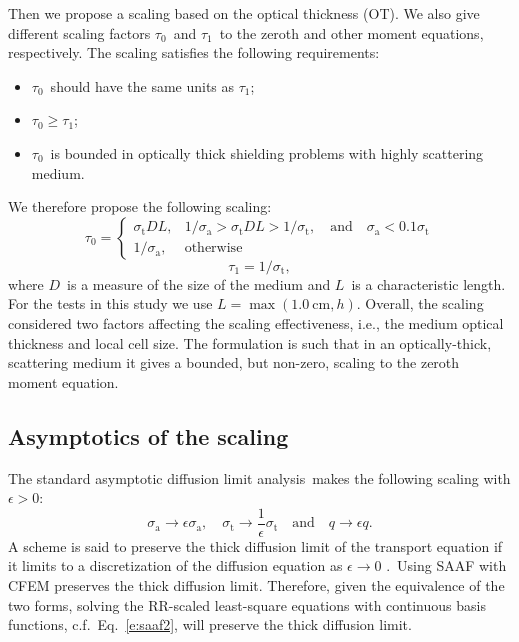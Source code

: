 \documentclass[review]{elsarticle}
\newcommand{\st}{\sigma_\mathrm{t}}
\newcommand{\siga}{\sigma_\mathrm{a}}
\newcommand{\quand}{\quad\mathrm{and}\quad}
\begin{document}
Then we propose a scaling based on the optical thickness (OT). We also give different scaling factors $\tau_0$\ and $\tau_1$\ to the zeroth and other moment equations, respectively. The scaling satisfies the following requirements:
\begin{itemize}
	\item $\tau_0$\ should have the same units as $\tau_1$;
	\item $\tau_0\geq\tau_1$;
	\item $\tau_0$\ is bounded in optically thick shielding problems with highly scattering medium.
\end{itemize}
We therefore propose the following scaling:
\begin{equation}\label{e:tau}
\tau_0=\begin{cases}
\st DL,&1/\siga>\st DL>1/\st, \quad \text{and} \quad \siga<0.1\st\\
1/\siga,&\mathrm{otherwise}
\end{cases}
\end{equation}
\begin{equation}
\tau_1=1/\st,
\end{equation}
where $D$\ is a measure of the size of the medium and $L$\ is a characteristic length. For the tests in this study we use  $L=\max(1.0\ \mathrm{cm}, h)$. Overall, the scaling considered two factors affecting the scaling effectiveness, i.e., the medium optical thickness and local cell size. %
The formulation is such that in an optically-thick, scattering medium it gives a bounded, but non-zero, scaling to the zeroth moment equation.

\subsection{Asymptotics of the scaling}\label{s:asym}
The standard asymptotic diffusion limit analysis\cite{larsen_1987,spn_derive}\ makes the following scaling with $\epsilon >0$:
\begin{equation}\label{e:pscale}
\siga\to\epsilon\siga,\quad\st\to\frac{1}{\epsilon}\st\quand q\to\epsilon q.
\end{equation}
A scheme is said to preserve the thick diffusion limit of the transport equation if it limits to a discretization of the diffusion equation as $\epsilon \rightarrow 0$ \cite{larsen_1987,larsen_1989}.\ Using SAAF with CFEM preserves the thick diffusion limit. Therefore, given the equivalence of the two forms, solving the RR-scaled least-square equations with continuous basis functions, c.f.\ Eq.\ \eqref{e:saaf2}, will preserve the thick diffusion limit. 
\end{document}
